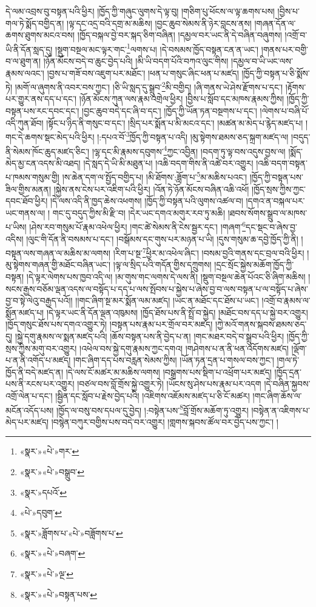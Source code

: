 དེ་ལམ་འབྲས་བུ་བསྟན་པའི་ཕྱིར། །ཁྱོད་ཀྱི་གཞུང་ལུགས་དེ་ལྟ་བུ། །གཅིག་པུ་ཕོངས་ལ་ལྟ་ཆགས་པས། །བྱིས་པ་གལ་ཏེ་སྨོད་བགྱིད་ན། །ལྟ་དང་འདྲ་བའི་དགྲ་མ་མཆིས། །བྱང་ཆུབ་སེམས་ནི་ཉེར་བླངས་ནས། །གཞན་དོན་ལ་ཆགས་ཐུགས་མངའ་བས། །ཁྱོད་བསྐལ་བྱེ་བར་སྐད་ཅིག་བཞིན། །དམྱལ་བར་ཡང་ནི་དེ་བཞིན་བཞུགས། །འགྲོ་བ་ཡི་ནི་དོན་སླད་དུ། །སྡུག་བསྔལ་མང་ལྟར་གང་\footnote{«སྣར་»«པེ་»གར་}ལགས་པ། །དེ་བསམས་ཁྱོད་བསྟན་ངན་ན་ཡང་། །གནས་པར་བགྱི་བ་ལ་ཐུག་ན། །ཉོན་མོངས་བདེ་བ་ཆུང་བྱེད་པའི། །མི་ཡི་བདག་པོའི་བཀའ་ལུང་གིས། །དམྱལ་བ་ཡི་ཡང་ལས་རྣམས་ལའང་། །བྱས་པ་གཟོ་བས་འཇུག་པར་མཐོང་། །ཕན་པ་གསུང་ཞིང་ཕན་པ་མཛད། །ཁྱོད་ཀྱི་བསྟན་པ་ཅི་སྨོས་ཏེ། །མགོ་ལ་ཞུགས་ནི་འབར་བས་ཀྱང་། །ཅི་ཡི་སླད་དུ་སྒྲུབ་\footnote{«སྣར་»«པེ་»བསྒྲུབ་}མི་བགྱིད། །ཞི་གནས་ཡེ་ཤེས་རྫོགས་པ་དང་། །རྟོགས་པར་གྱུར་ནས་དད་པ་དང་། །ཉོན་མོངས་ཀུན་ལས་རྣམ་འགྲེལ་ཕྱིར། །བྱིས་པ་སློབ་དང་མཁས་རྣམས་ཀྱིས། །ཁྱོད་ཀྱི་བསྟན་པས་རང་དབང་དང་། །བྱང་ཆུབ་བདེ་དང་ཞི་བ་དང་། །ཁྱོད་ཀྱི་ཡོན་ཏན་བསྔགས་པ་དང་། །ལེགས་པ་བཞི་པོ་འདི་ཀུན་ཐོབ། །སྟོང་པ་ཉིད་ནི་གསུང་བ་དང་། །སྲིད་པར་སྨོན་པ་མི་མངའ་དང་། །མཚན་མ་མེད་པ་རྙེད་མཛད་པ། །གང་དེ་ཆགས་སྡང་མེད་པའི་ཕྱིར། །:དཔའ་བོ་\footnote{«སྣར་»དཔའོ་}ཁྱོད་ཀྱི་བསྟན་པ་འདི། །མུ་སྟེགས་ཐམས་ཅད་སྐྲག་མཛད་ལ། །བདུད་ནི་སེམས་ཁོང་ཆུད་མཛད་ཅིང་། །ལྷ་དང་མི་རྣམས་དབུགས་\footnote{«པེ་»དབུག་}ཀྱང་འབྱིན། །བདག་ཏུ་ལྟ་བས་འདུས་བྱས་ལ། །སྨོད་མེད་མྱ་ངན་འདས་མི་འཐད། །དེ་སླད་དེ་ཡི་མི་མཐུན་པ། །འཆི་བདག་གིས་ནི་འཚེ་བར་འགྱུར། །འཆི་བདག་བསྟན་པ་ཁམས་གསུམ་གྱི། །ས་ཆེན་དག་ལ་སྤྱོད་བགྱིད་པ། །མི་ཐོགས་:ཟློག་པ་\footnote{«སྣར་»ཟློགས་པ་«པེ་»བཟློགས་པ་}མ་མཆིས་པའང་། །ཁྱོད་ཀྱི་བསྟན་པས་ཟིལ་གྱིས་མནན། །སྐྱེས་ནས་ངེས་པར་འཇིག་པའི་ཕྱིར། །འོན་ཏེ་ཉོན་མོངས་བཞིན་འཆི་འཕོ། །ཁྱོད་སྲས་ཀྱིས་ཀྱང་དབང་ཐོབ་ཕྱིར། །དེ་ལས་འདི་ནི་ཁྱད་ཆེས་འཕགས། །ཁྱོད་ཀྱི་བསྟན་པའི་ལུགས་འཚལ་བ། །དགའ་ན་བསྐལ་པར་ཡང་གནས་ལ། །
གང་དུ་བདུད་ཀྱིས་མི་རྫི་བ། །དེར་ཡང་དགའ་མགུར་རབ་ཏུ་མཆི། །ཐབས་སོགས་སྒྲུབ་ལ་མཁས་པ་ཡིས། །ཤེས་རབ་གསུམ་པོ་རྣམ་འཕེལ་ཕྱིར། །གང་ཚེ་སེམས་ནི་ངེས་སྦྱར་དང་། །གཞག་\footnote{«སྣར་»«པེ་»བཞག་}དང་སྡང་བ་ཞེས་བྱ་འདིས། །ལུང་གི་དོན་ནི་བསམས་པ་དང་། །བསྒོམས་དང་གུས་པར་མཉན་པ་ཡི། །དུས་གསུམ་ཆ་དབྱེ་ཁྱོད་ཀྱི་ནི། །བསྟན་ལས་གཞན་ལ་མཆིས་མ་ལགས། །རིག་པ་སྔ་\footnote{«སྣར་»«པེ་»ལྔ་}ཕྱིར་མ་འཕེལ་ཞིང་། །བསམ་བྱའི་གནས་དང་བྲལ་བའི་ཕྱིར། །མུ་སྟེགས་གཞན་གྱི་མཐོང་བཞིན་ཡང་། །ལྟ་ལ་སྲིད་པའི་གདོན་གྱིས་དཀྲུགས། །དྲང་སྲོང་སྐྱེས་མཆོག་ཁྱོད་ཀྱི་བསྟན། །དེ་ལྟར་ལེགས་པས་ཁྱབ་འདི་ལ། །མ་གུས་གང་ལགས་དེ་ལས་ནི། །སྡུག་བསྔལ་ཆེན་པོའང་ཅི་ཞིག་མཆིས། །སངས་རྒྱས་བཅོམ་ལྡན་འདས་ལ་བསྟོད་པ་དད་པ་ལས་སྤོབས་པ་སྐྱེས་པ་ཞེས་བྱ་བ་ལས་བསྟན་པ་ལ་བསྟོད་པ་ཞེས་བྱ་བ་སྟེ་ལེའུ་བརྒྱད་པའོ།། །།གང་ཞིག་སྔ་མར་སྨོན་ལམ་མཛད། །ཡང་ན་མཐོང་དང་ཐོས་པ་ཡང་། །འགྲོ་བ་རྣམས་ལ་སྨོན་མཛད་པ། །དེ་ལྟར་ཡང་ནི་དོན་ལྡན་འཁུམས། །ཁྱོད་ཐོས་པས་ནི་སྤྲོ་བ་སྐྱེད། །མཐོང་བས་དད་པ་སྐྱེ་བར་འགྱུར། །ཁྱོད་གསུང་ཐོས་པས་དགའ་འགྱུར་ཏེ། །བསྟན་པས་རྣམ་པར་གྲོལ་བར་མཛད། །ཀྱེ་མའོ་གནས་སྐབས་ཐམས་ཅད་དུ། །སྐྱེ་དགུ་རྣམས་ལ་སྨན་མཛད་པའི། །ཆོས་བསྟན་པས་ནི་བྱེད་པ་ན། །གང་མཐར་བདེ་བ་སྒྲུབ་པའི་ཕྱིར། །ཁྱོད་ཀྱི་སྲས་ཀྱིས་མགུ་བར་འགྱུར། །འཕེལ་བས་སྐྱེ་དགུ་རྣམས་ཀྱང་དགའ། །གཤེགས་པ་ན་ནི་ཕན་འདོགས་མཛད། །ལྡོག་པ་ན་ནི་འགོད་པ་མཛད། །གང་ཞིག་དད་པས་བརླན་སེམས་ཀྱིས། །ཡོན་ཏན་དྲན་པ་གསལ་བས་ཀྱང་། །གལ་ཏེ་ཁྱོད་ནི་བདེ་མཛད་ན། །དེ་ལས་ངོ་མཚར་མ་མཆིས་ལགས། །བསྒྲགས་པས་སྡིག་པ་འཕྲོག་པར་མཛད། །ཁྱོད་དྲན་པས་ནི་རངས་པར་འགྱུར། །བཙལ་བས་བློ་གྲོས་སྐྱེ་འགྱུར་ཏེ། །ཡོངས་སུ་ཤེས་པས་རྣམ་པར་འདག །དེ་བཞིན་སྐྱབས་འགྲོ་ལེན་པ་དང་། །སྦྱིན་དང་སློབ་པ་རྗེས་བྱེད་པའི། །འཇིགས་འཇོམས་མཛད་པ་ཅི་ངོ་མཚར། །གང་ཞིག་ཆོས་ལ་མངོན་འདོད་པས། །ཁྱོད་ལ་བསུ་བས་དཔལ་དུ་བྱེད། །:བསྟེན་པས་\footnote{«སྣར་»«པེ་»བསྟན་པས་}བློ་གྲོས་མཆོག་ཏུ་འགྱུར། །བསྟེན་ན་འཇིགས་པ་མེད་པར་མཛད། །བསྙེན་བཀུར་བགྱིས་པས་བདེ་བར་འགྱུར། །གླགས་སྐབས་ཚོལ་བར་བྱེད་པས་ཀྱང་། །
